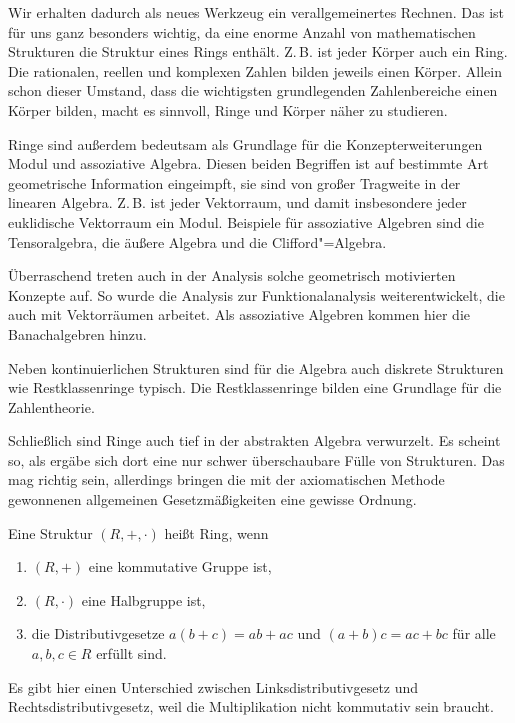 Wir erhalten dadurch als neues Werkzeug ein verallgemeinertes Rechnen.
Das ist für uns ganz besonders wichtig, da eine enorme Anzahl
von mathematischen Strukturen die Struktur eines Rings enthält.
Z.\,B. ist jeder Körper auch ein Ring. Die rationalen, reellen
und komplexen Zahlen bilden jeweils einen Körper. Allein schon
dieser Umstand, dass die wichtigsten grundlegenden Zahlenbereiche
einen Körper bilden, macht es sinnvoll, Ringe und Körper näher zu
studieren.

Ringe sind außerdem bedeutsam als Grundlage für die
Konzepterweiterungen Modul und assoziative Algebra. 
Diesen beiden Begriffen ist auf bestimmte Art geometrische
Information eingeimpft, sie sind von großer Tragweite in der
linearen Algebra. Z.\,B. ist jeder Vektorraum, und damit insbesondere
jeder euklidische Vektorraum ein Modul. Beispiele für assoziative
Algebren sind die Tensoralgebra, die äußere Algebra und die
Clifford"=Algebra.

Überraschend treten auch in der Analysis solche geometrisch
motivierten Konzepte auf. So wurde die Analysis zur Funktionalanalysis
weiterentwickelt, die auch mit Vektorräumen arbeitet. Als assoziative
Algebren kommen hier die Banachalgebren hinzu.

Neben kontinuierlichen Strukturen sind für die Algebra auch
diskrete Strukturen wie Restklassenringe typisch. Die Restklassenringe
bilden eine Grundlage für die Zahlentheorie.

Schließlich sind Ringe auch tief in der abstrakten Algebra verwurzelt.
Es scheint so, als ergäbe sich dort eine nur schwer überschaubare Fülle
von Strukturen. Das mag richtig sein, allerdings bringen die mit der
axiomatischen Methode gewonnenen allgemeinen Gesetzmäßigkeiten eine
gewisse Ordnung.

\begin{Definition}[Ring]\newlinefirst
Eine Struktur $(R,+,\cdot)$ heißt Ring, wenn
\begin{enumerate}
\item $(R,+)$ eine kommutative Gruppe ist,
\item $(R,\cdot)$ eine Halbgruppe ist,
\item die Distributivgesetze $a(b+c)=ab+ac$ und $(a+b)c=ac+bc$
für alle $a,b,c\in R$ erfüllt sind.
\end{enumerate}
\end{Definition}
Es gibt hier einen Unterschied zwischen Linksdistributivgesetz
und Rechtsdistributivgesetz, weil die Multiplikation nicht
kommutativ sein braucht.

